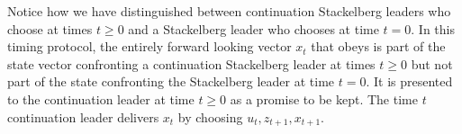 \smallskip
\noindent Notice how we have distinguished between  continuation Stackelberg leaders who choose at times $t \geq 0$ and a Stackelberg leader who
chooses at time $t=0$.
In this timing protocol, the entirely  forward looking vector $x_t$ that obeys  is part of the  state vector confronting
a continuation Stackelberg leader at times $t \geq 0$ but not  part of the state confronting the Stackelberg leader at time $t=0$.  It is  presented to the continuation leader
at time $t \geq 0$ as a promise to be kept.  The time $t$ continuation leader delivers $x_t$  by choosing $u_t, z_{t+1}, x_{t+1}$.

